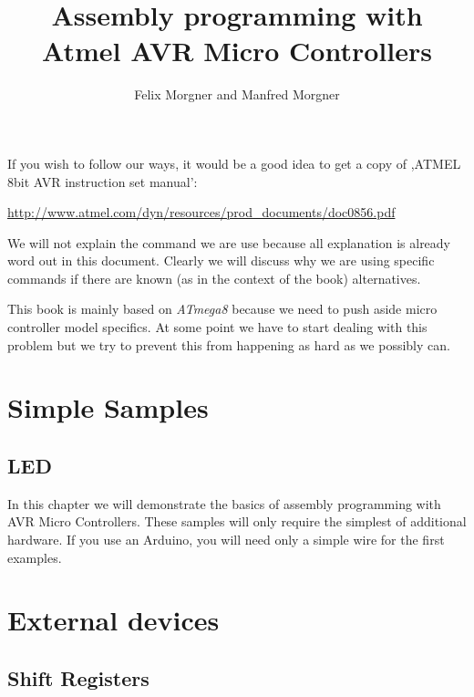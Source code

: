 \documentclass[twoside,english,12pt,authoryear,openright]{book}
\newcommand{\at}{\textit{ATmega8} }
\begin{document}

\title{Assembly programming with Atmel AVR Micro Controllers}

\author{Felix Morgner and Manfred Morgner}


\maketitle

If you wish to follow our ways, it would be a good idea to get a copy of  ,ATMEL 8bit AVR instruction set manual':

\url{http://www.atmel.com/dyn/resources/prod_documents/doc0856.pdf}

We will not explain the command we are use because all explanation is already word out in this document. Clearly we will discuss why we are using specific commands if there are known (as in the context of the book) alternatives.

This book is mainly based on \at because we need to push aside micro controller model specifics. At some point we have to start dealing with this problem but we try to prevent this from happening as hard as we possibly can.

\tableofcontents{}


\part{Simple Samples}

\chapter{LED}

In this chapter we will demonstrate the basics of assembly programming with AVR Micro Controllers. These samples
will only require the simplest of additional hardware. If you use an Arduino, you will need only a simple wire for the first
examples.






\part{External devices}

\chapter{Shift Registers}


\end{document}
